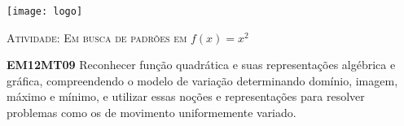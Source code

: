 \documentclass[10 pt,usenames,dvipsnames, oneside]{article}
\begin{document}
\begin{center}
  \begin{minipage}[l]{3cm}
\texttt{[image: logo]}    
\end{minipage}\hfill
\begin{minipage}[r]{.8\textwidth}
 {\Large \scshape Atividade: Em busca de padrões em \(f(x)=x^2\)}  
\end{minipage}
\end{center}
\vspace{.2cm}

\ifdefined\prof
\begin{objetivos}
\item \textbf{EM12MT09} Reconhecer função quadrática e suas representações algébrica e gráfica, compreendendo o
modelo de variação determinando domínio, imagem, máximo e mínimo, e utilizar essas noções e
representações para resolver problemas como os de movimento uniformemente variado.
\end{objetivos}
\end{document}
